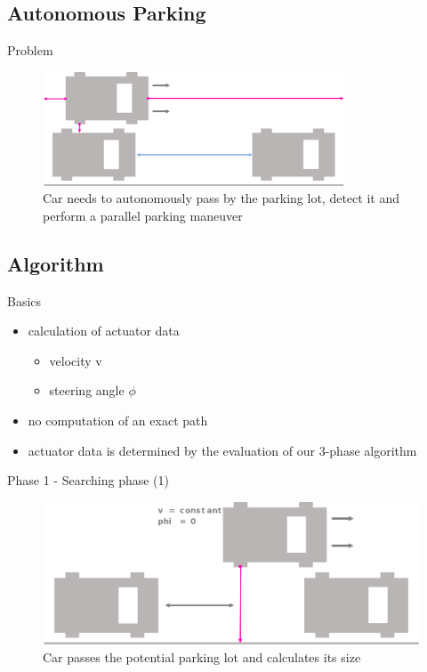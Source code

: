 \documentclass[aspectratio=169]{beamer}
\begin{document}
  \subsection{Autonomous Parking}
  \begin{frame}{Problem}
  	\begin{figure} [ht]
  		\centering
  		\includegraphics[width=0.8\textwidth]{david_images/Problem.png}
  		\caption{\tiny Car needs to autonomously pass by the parking lot, detect it and perform a parallel parking maneuver}
	\end{figure}
  \end{frame}

  \subsection{Algorithm}
  \begin{frame}{Basics}
  	\begin{itemize}
  	\item<1-> calculation of actuator data
  		\begin{itemize}
  		 \item<2-> velocity v
  		 \item<3-> steering angle $\phi$
  		\end{itemize}
  	\item<4-> no computation of an exact path
  	\item<5-> actuator data is determined by the evaluation of our 3-phase algorithm
  	\end{itemize}
  \end{frame}

  \begin{frame}{Phase 1 - Searching phase (1)}
  	\begin{figure} [ht]
  		\centering
  		\includegraphics[width=1.0\textwidth]{david_images/FindLot1.png}
  		\caption{\tiny Car passes the potential parking lot and calculates its size}
	\end{figure}
  \end{frame}
\end{document}
